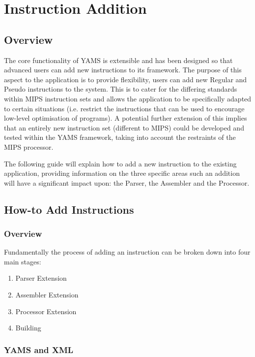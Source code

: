 \documentclass[12pt]{report}
\begin{document}
\chapter{Instruction Addition}

\tableofcontents
\thispagestyle{empty}


\section{Overview}

The core functionality of YAMS is extensible and has been designed so that advanced users can add new instructions to its framework. The purpose of this aspect to the application is to provide flexibility, users can add new Regular and Pseudo instructions to the system. This is to cater for the differing standards within MIPS instruction sets and allows the application to be specifically adapted to certain situations (i.e. restrict the instructions that can be used to encourage low-level optimisation of programs). A potential further extension of this implies that an entirely new instruction set (different to MIPS) could be developed and tested within the YAMS framework, taking into account the restraints of the MIPS processor.

The following guide will explain how to add a new instruction to the existing application, providing information on the three specific areas such an addition will have a significant impact upon: the Parser, the Assembler and the Processor.

\section{How-to Add Instructions}

\subsection{Overview}

Fundamentally the process of adding an instruction can be broken down into four main stages:

\begin{enumerate}
\item Parser Extension
\item Assembler Extension
\item Processor Extension
\item Building
\end{enumerate}

\subsection{YAMS and XML}
\end{document}

